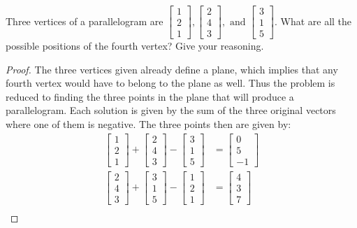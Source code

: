 \begin{exercise} \label{e1.1.2}
    Three vertices of a parallelogram are \( \begin{bmatrix} 1 \\ 2 \\ 1 \end{bmatrix}, \begin{bmatrix} 2 \\ 4 \\ 3 \end{bmatrix},\text{ and } \begin{bmatrix} 3 \\ 1 \\ 5 \end{bmatrix} \). What are all the possible positions of the fourth vertex? Give your reasoning.
    
    \begin{proof}
        The three vertices given already define a plane, which implies that any fourth vertex would have to belong to the plane as well. Thus the problem is reduced to finding the three points in the plane that will produce a parallelogram. Each solution is given by the sum of the three original vectors where one of them is negative. The three points then are given by:
        \begin{align*}
            \begin{bmatrix} 1 \\ 2 \\ 1 \end{bmatrix} + \begin{bmatrix} 2 \\ 4 \\ 3 \end{bmatrix} - \begin{bmatrix} 3 \\ 1 \\ 5  \end{bmatrix} &= \begin{bmatrix} 0 \\ 5 \\ -1 \end{bmatrix} \\
            \begin{bmatrix} 2 \\ 4 \\ 3 \end{bmatrix} + \begin{bmatrix} 3 \\ 1 \\ 5 \end{bmatrix} - \begin{bmatrix} 1 \\ 2 \\ 1 \end{bmatrix} &= \begin{bmatrix} 4 \\ 3 \\ 7 \end{bmatrix} \\

\end{align*}
\end{proof}
\end{exercise}
